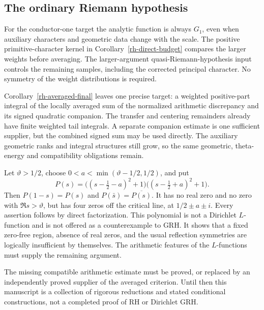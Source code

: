 \subsection{The ordinary Riemann hypothesis}

For the conductor-one target the analytic function is always $G_1$,
even when auxiliary characters and geometric data change with the
scale. The positive primitive-character kernel in
Corollary~\ref{rh-direct-budget} compares the larger weights before
averaging. The larger-argument quasi-Riemann-hypothesis input controls
the remaining samples, including the corrected principal character.
No symmetry of the weight distributions is required.

Corollary~\ref{rh-averaged-final} leaves one precise target: a weighted
positive-part integral of the locally averaged sum of the normalized
arithmetic discrepancy and its signed quadratic companion. The
transfer and centering remainders already have finite weighted tail
integrals. A separate companion estimate is one sufficient supplier,
but the combined signed sum may be used directly. The auxiliary
geometric ranks and integral structures still grow, so the same
geometric, theta-energy and compatibility obligations remain.

\begin{example}
Let $\vartheta>1/2$, choose
$0<a<\min(\vartheta-1/2,1/2)$, and put
\[
 P(s)=\bigl((s-\tfrac12-a)^2+1\bigr)
       \bigl((s-\tfrac12+a)^2+1\bigr).
\]
Then $P(1-s)=P(s)$ and
$P(\bar s)=\overline{P(s)}$. It has no real zero and no zero
with $\Re s>\vartheta$, but has four zeros off the critical
line, at $1/2\pm a\pm i$. Every assertion follows by direct
factorization. This polynomial is not a Dirichlet $L$-function
and is not offered as a counterexample to GRH. It shows that
a fixed zero-free region, absence of real zeros, and the usual
reflection symmetries are logically insufficient by themselves.
The arithmetic features of the $L$-functions must supply the
remaining argument.
\end{example}

The missing compatible arithmetic estimate must be proved, or replaced
by an independently proved supplier of the averaged criterion. Until
then this manuscript is a collection of rigorous reductions and stated
conditional constructions, not a completed proof of RH or Dirichlet GRH.
